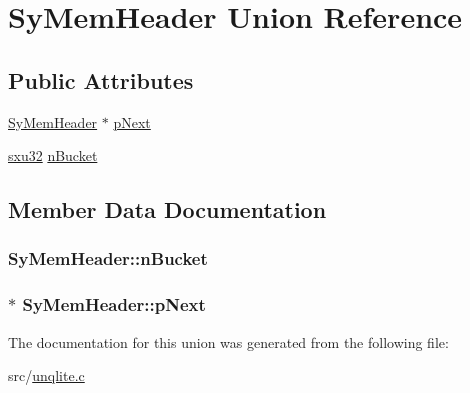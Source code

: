 \hypertarget{union_sy_mem_header}{\section{Sy\-Mem\-Header Union Reference}
\label{d5/d7c/union_sy_mem_header}
}
\subsection*{Public Attributes}
\begin{DoxyCompactItemize}
\item 
\hyperlink{union_sy_mem_header}{Sy\-Mem\-Header} $\ast$ \hyperlink{union_sy_mem_header_a5069838177c640cfb179537b0ac47c38}{p\-Next}
\item 
\hyperlink{unqlite_8c_abc5a8a3f345c200c98c485551f49666e}{sxu32} \hyperlink{union_sy_mem_header_a1eeb7482bcd94dd902f8ddef2e2f6d66}{n\-Bucket}
\end{DoxyCompactItemize}


\subsection{Member Data Documentation}
\hypertarget{union_sy_mem_header_a1eeb7482bcd94dd902f8ddef2e2f6d66}{
\subsubsection[{n\-Bucket}]{ Sy\-Mem\-Header\-::n\-Bucket}}\label{d5/d7c/union_sy_mem_header_a1eeb7482bcd94dd902f8ddef2e2f6d66}
\hypertarget{union_sy_mem_header_a5069838177c640cfb179537b0ac47c38}{
\subsubsection[{p\-Next}]{$\ast$ Sy\-Mem\-Header\-::p\-Next}}\label{d5/d7c/union_sy_mem_header_a5069838177c640cfb179537b0ac47c38}


The documentation for this union was generated from the following file\-:\begin{DoxyCompactItemize}
\item 
src/\hyperlink{unqlite_8c}{unqlite.\-c}\end{DoxyCompactItemize}
